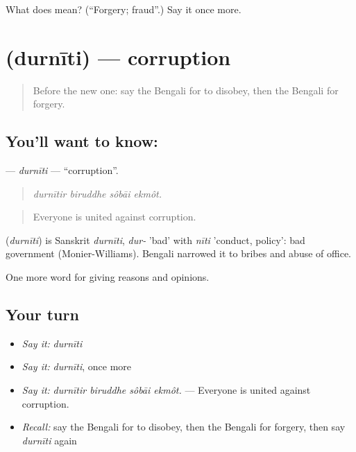 \begin{tcolorbox}[breakable,colback=teal!4,colframe=teal!35!black,title={Before you move on}]
What does  mean? (\textquotedblleft{}Forgery; fraud\textquotedblright{}.) Say it once more.
\end{tcolorbox}
\section[\texorpdfstring{\bn{দুর্নীতি} (durnīti)}{দুর্নীতি (durnīti)}]{ (durnīti) — corruption}

\label{lesson:BN-C341-durniti}



\begin{quote}
Before the new one: say the Bengali for to disobey, then the Bengali for forgery.
\end{quote}

\subsection*{You'll want to know: }
\textbf{} — \emph{durnīti} — \textquotedblleft{}corruption\textquotedblright{}.

\begin{quote}
   
\end{quote}

\begin{quote}
\emph{durnītir biruddhe sôbāi ekmôt.}
\end{quote}

\begin{quote}
Everyone is united against corruption.
\end{quote}

\begin{cousinweb}
\textbf{} (\emph{durnīti}) is Sanskrit \emph{durnīti}, \emph{dur-} 'bad' with \emph{nīti} 'conduct, policy': bad government (Monier-Williams). Bengali narrowed it to bribes and abuse of office.
\end{cousinweb}

\begin{grammarlens}[title={What you've built}]
One more word for giving reasons and opinions.
\end{grammarlens}

\subsection*{Your turn}
\begin{itemize}
\raggedright
  \item \emph{Say it:} \emph{durnīti}
  \item \emph{Say it:} \emph{durnīti}, once more
  \item \emph{Say it:} \emph{durnītir biruddhe sôbāi ekmôt.} — Everyone is united against corruption.
  \item \emph{Recall:} say the Bengali for to disobey, then the Bengali for forgery, then say \emph{durnīti} again
\end{itemize}

